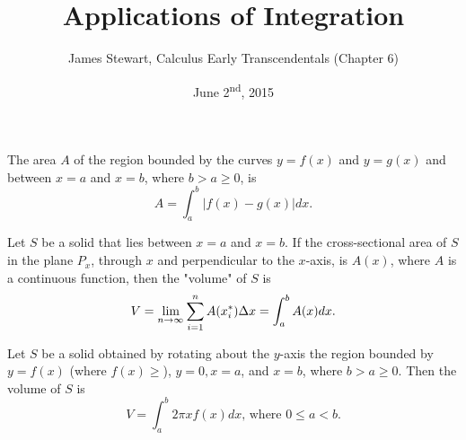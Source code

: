\documentclass[a4paper,11pt]{article}
\title{Applications of Integration}
\author{James Stewart, Calculus Early Transcendentals (Chapter 6)}
\date{June 2\textsuperscript{nd}, 2015}
\begin{document}
\maketitle
{}

\begin{outline}

    The area \(A\) of the region bounded by the curves \(y = f(x)\) and \(y = g(x)\) and between \(x=a\) and \(x=b\),
    where \(b > a \geq 0\), is \[ A = \int_a^b |f(x)-g(x)|dx\text{.} \]
    
    Let \(S\) be a solid that lies between \(x = a\) and \(x = b\). If the cross-sectional area of \(S\) in the
    plane \(P_x\), through \(x\) and perpendicular to the \(x\)-axis, is \(A(x)\), where \(A\) is a continuous function,
    then the "volume" of \(S\) is \[V = \lim\limits_{n\rightarrow \infty^{}} \sum_{i=1}^n A(x_i^*)\Delta x = \int_a^bA(x)dx\text{.}\]
    
    Let \(S\) be a solid obtained by rotating about the \(y\)-axis the region bounded by \(y = f(x)\) (where \(f(x)
    \geq \)), \(y = 0, x = a\), and \(x = b\), where \(b > a \geq 0\). Then the volume of \(S\) is 
    \[ V= \int_a^b 2\pi x f(x)dx\text{, where } 0 \leq a < b\text{.} \]
    

\end{outline}
\end{document}
